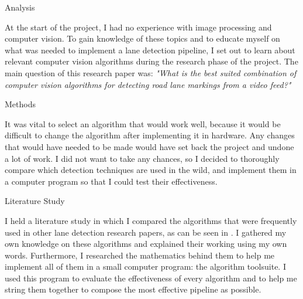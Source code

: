 \documentclass{matthijs}
\begin{document}
	\begin{hoofdstuk}{Analysis}

		\setlength\parindent{1.5em}
		\setlength{\parskip}{0.5em plus 0.2em minus 0.1em}
		\linespread{1.2}
		\vspace{-1ex}
		
		At the start of the project, I had no experience with image processing and computer vision.
		To gain knowledge of these topics and to educate myself on what was needed to implement a lane detection pipeline, I set out to learn about relevant computer vision algorithms during the research phase of the project.
		The main question of this research paper was: \textit{"What is the best suited combination of computer vision algorithms for detecting road lane markings from a video feed?"}

		\begin{paragraaf}{Methods}

			It was vital to select an algorithm that would work well, because it would be difficult to change the algorithm after implementing it in hardware.
			Any changes that would have needed to be made would have set back the project and undone a lot of work.
			I did not want to take any chances, so I decided to thoroughly compare which detection techniques are used in the wild, and implement them in a computer program so that I could test their effectiveness.

			\begin{subparagraaf}{Literature Study}
		
				I held a literature study in which I compared the algorithms that were frequently used in other lane detection research papers, as can be seen in .
				I gathered my own knowledge on these algorithms and explained their working using my own words.
				Furthermore, I researched the mathematics behind them to help me implement all of them in a small computer program: the algorithm toolsuite.
				I used this program to evaluate the effectiveness of every algorithm and to help me string them together to compose the most effective pipeline as possible.
				

\end{subparagraaf}
\end{paragraaf}
\end{hoofdstuk}
\end{document}
